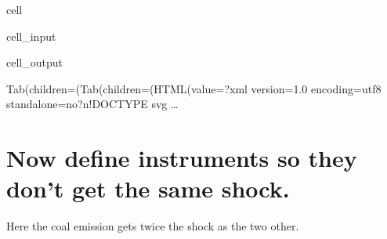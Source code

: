 \documentclass[letterpaper,10pt,english]{jupyterBook}
\begin{document}
\begin{sphinxuseclass}{cell}\begin{sphinxVerbatimInput}

\begin{sphinxuseclass}{cell_input}
\begin{sphinxVerbatim}[commandchars=\\\{\}]
\PYG{p}{[}\PYG{p}{]}
\end{sphinxVerbatim}

\end{sphinxuseclass}\end{sphinxVerbatimInput}
\begin{sphinxVerbatimOutput}

\begin{sphinxuseclass}{cell_output}
\begin{sphinxVerbatim}[commandchars=\\\{\}]
Tab(children=(Tab(children=(HTML(value=\PYGZsq{}\PYGZlt{}?xml version=\PYGZdq{}1.0\PYGZdq{} encoding=\PYGZdq{}utf\PYGZhy{}8\PYGZdq{} standalone=\PYGZdq{}no\PYGZdq{}?\PYGZgt{}\PYGZbs{}n\PYGZlt{}!DOCTYPE svg …
\end{sphinxVerbatim}

\begin{sphinxVerbatim}[commandchars=\\\{\}]

\end{sphinxVerbatim}

\end{sphinxuseclass}\end{sphinxVerbatimOutput}

\end{sphinxuseclass}

\section{Now define instruments so they don’t get the same shock.}
\label{\detokenize{content/howto/targetinstruments/One target one instrument with 3 instrument variables:now-define-instruments-so-they-don-t-get-the-same-shock}}
\sphinxAtStartPar
Here the coal emission gets twice the shock as the two other.
\end{document}
